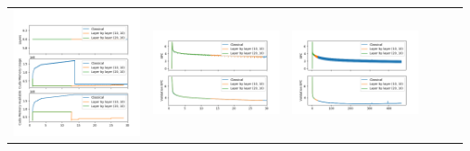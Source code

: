 \begin{longtable}[]{@{}llllll@{}}
\includegraphics{lbl_memory.png} & \includegraphics{lbl_frac.png} &
\includegraphics{lbl_frac_full.png}\tabularnewline

\end{longtable}
